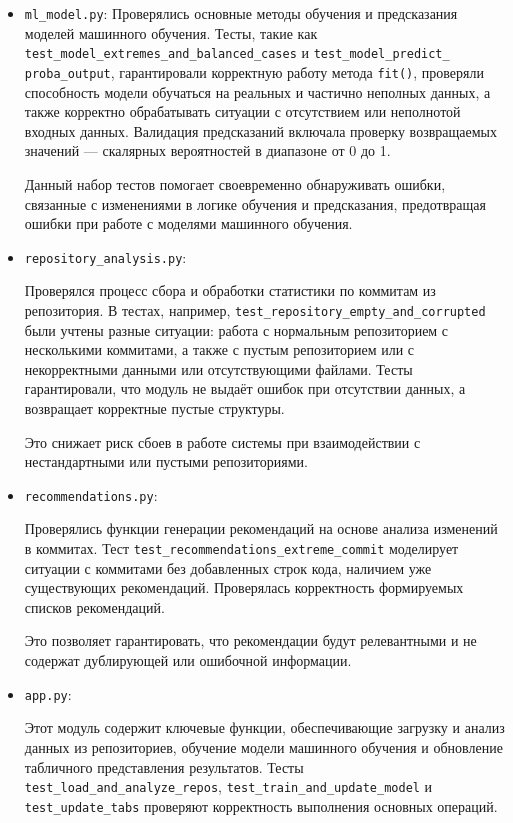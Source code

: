 \begin{itemize}
	\item \texttt{ml\_model.py}:
Проверялись основные методы обучения и предсказания моделей машинного обучения. Тесты, такие как \verb|test_model_extremes_and_balanced_cases| и \verb|test_model_predict_|
\verb|proba_output|, гарантировали корректную работу метода \texttt{fit()}, проверяли способность модели обучаться на реальных и частично неполных данных, а также корректно обрабатывать ситуации с отсутствием или неполнотой входных данных. Валидация предсказаний включала проверку возвращаемых значений — скалярных вероятностей в диапазоне от 0 до 1.

Данный набор тестов помогает своевременно обнаруживать ошибки, связанные с изменениями в логике обучения и предсказания, предотвращая ошибки при работе с моделями машинного обучения.

\item \texttt{repository\_analysis.py}:

Проверялся процесс сбора и обработки статистики по коммитам из репозитория. В тестах, например, \texttt{test\_repository\_empty\_and\_corrupted} были учтены разные ситуации: работа с нормальным репозиторием с несколькими коммитами, а также с пустым репозиторием или с некорректными данными или отсутствующими файлами. Тесты гарантировали, что модуль не выдаёт ошибок при отсутствии данных, а возвращает корректные пустые структуры.  

Это снижает риск сбоев в работе системы при взаимодействии с нестандартными или пустыми репозиториями.

\item \texttt{recommendations.py}: 

Проверялись функции генерации рекомендаций на основе анализа изменений в коммитах. Тест \texttt{test\_recommendations\_extreme\_commit} моделирует ситуации с коммитами без добавленных строк кода, наличием уже существующих рекомендаций. Проверялась корректность формируемых списков рекомендаций.

Это позволяет гарантировать, что рекомендации будут релевантными и не содержат дублирующей или ошибочной информации.

\item \texttt{app.py}:

Этот модуль содержит ключевые функции, обеспечивающие загрузку и анализ данных из репозиториев, обучение модели машинного обучения и обновление табличного представления результатов. Тесты \texttt{test\_load\_and\_analyze\_repos}, \texttt{test\_train\_and\_update\_model} и \texttt{test\_update\_tabs} проверяют корректность выполнения основных операций.
\end{itemize}

